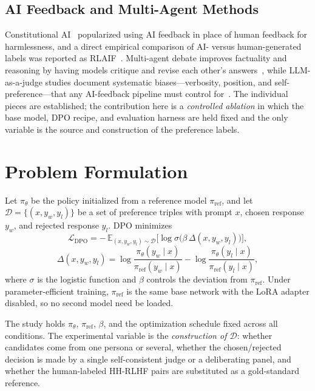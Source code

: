 \documentclass[conference]{IEEEtran}
\begin{document}
\subsection{AI Feedback and Multi-Agent Methods}
Constitutional AI~\cite{bai2022constitutional} popularized using AI feedback in
place of human feedback for harmlessness, and a direct empirical comparison of
AI- versus human-generated labels was reported as RLAIF~\cite{lee2023rlaif}.
Multi-agent debate improves factuality and reasoning by having models critique and
revise each other's answers~\cite{du2023debate}, while LLM-as-a-judge studies
document systematic biases---verbosity, position, and self-preference---that any
AI-feedback pipeline must control for~\cite{zheng2023judge}. The individual
pieces are established; the contribution here is a \emph{controlled ablation} in
which the base model, DPO recipe, and evaluation harness are held fixed and the
only variable is the source and construction of the preference labels.

\section{Problem Formulation}
Let $\pi_\theta$ be the policy initialized from a reference model $\pi_{\text{ref}}$,
and let $\mathcal{D}=\{(x, y_w, y_l)\}$ be a set of preference triples with prompt
$x$, chosen response $y_w$, and rejected response $y_l$. DPO minimizes
\begin{equation}
\mathcal{L}_{\text{DPO}}
= -\,\mathbb{E}_{(x,y_w,y_l)\sim\mathcal{D}}
\Big[\log \sigma\big(\beta\, \Delta(x,y_w,y_l)\big)\Big],
\label{eq:dpo}
\end{equation}
\begin{equation}
\Delta(x,y_w,y_l)=
\log\frac{\pi_\theta(y_w\mid x)}{\pi_{\text{ref}}(y_w\mid x)}
-\log\frac{\pi_\theta(y_l\mid x)}{\pi_{\text{ref}}(y_l\mid x)},
\end{equation}
where $\sigma$ is the logistic function and $\beta$ controls the deviation from
$\pi_{\text{ref}}$. Under parameter-efficient training, $\pi_{\text{ref}}$ is the
same base network with the LoRA adapter disabled, so no second model need be
loaded.

The study holds $\pi_\theta$, $\pi_{\text{ref}}$, $\beta$, and the optimization
schedule fixed across all conditions. The experimental variable is the
\emph{construction of $\mathcal{D}$}: whether candidates come from one persona or
several, whether the chosen/rejected decision is made by a single self-consistent
judge or a deliberating panel, and whether the human-labeled HH-RLHF pairs are
substituted as a gold-standard reference.
\end{document}
